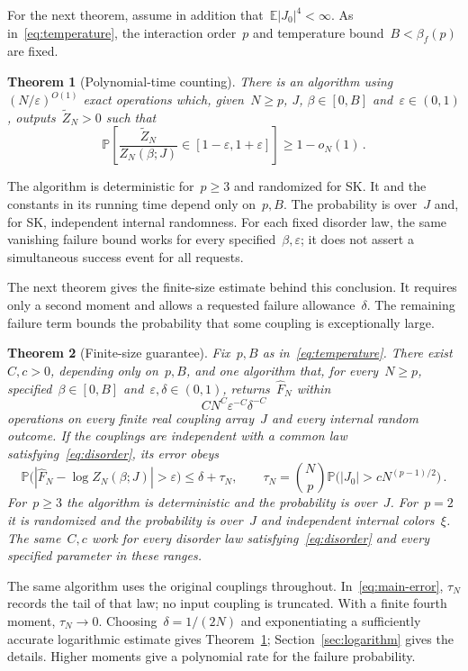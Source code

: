 \documentclass[10pt]{article}
\theoremstyle{plain}
\newtheorem{theorem}{Theorem}[section]
\theoremstyle{definition}
\theoremstyle{remark}
\begin{document}
For the next theorem, assume in addition that~$\mathbb E|J_0|^4<\infty$. As in~\eqref{eq:temperature}, the interaction order~$p$ and temperature bound~$B<\beta_f(p)$ are fixed.
\begin{theorem}[Polynomial-time counting]\label{cor:typical}
There is an algorithm using~$(N/\varepsilon)^{O(1)}$ exact operations which, given~$N\ge p$, $J$, $\beta\in[0,B]$ and~$\varepsilon\in(0,1)$, outputs~$\widetilde Z_N>0$ such that
\begin{equation}\label{eq:multiplicative-success}
 \mathbb P\!\left[
 \frac{\widetilde Z_N}{Z_N(\beta;J)}\in[1-\varepsilon,1+\varepsilon]
 \right]\ge1-o_N(1)\,.
\end{equation}
\end{theorem}
The algorithm is deterministic for~$p\ge3$ and randomized for SK. It and the constants in its running time depend only on~$p,B$. The probability is over~$J$ and, for SK, independent internal randomness. For each fixed disorder law, the same vanishing failure bound works for every specified~$\beta,\varepsilon$; it does not assert a simultaneous success event for all requests.

The next theorem gives the finite-size estimate behind this conclusion. It requires only a second moment and allows a requested failure allowance~$\delta$. The remaining failure term bounds the probability that some coupling is exceptionally large.
\begin{theorem}[Finite-size guarantee]\label{thm:main}
Fix~$p,B$ as in~\eqref{eq:temperature}. There exist~$C,c>0$, depending only on~$p,B$, and one algorithm that, for every~$N\ge p$, specified~$\beta\in[0,B]$ and~$\varepsilon,\delta\in(0,1)$, returns~$\widehat F_N$ within
\begin{equation}\label{eq:main-runtime}
 CN^C\varepsilon^{-C}\delta^{-C}
\end{equation}
operations on every finite real coupling array~$J$ and every internal random outcome. If the couplings are independent with a common law satisfying~\eqref{eq:disorder}, its error obeys
\begin{equation}\label{eq:main-error}
 \mathbb P\bigl(|\widehat F_N-\log Z_N(\beta;J)|>\varepsilon\bigr)
 \le\delta+\tau_N,\qquad
 \tau_N=\binom Np\mathbb P\bigl(|J_0|>cN^{(p-1)/2}\bigr)\,.
\end{equation}
For~$p\ge3$ the algorithm is deterministic and the probability is over~$J$. For~$p=2$ it is randomized and the probability is over~$J$ and independent internal colors~$\xi$. The same~$C,c$ work for every disorder law satisfying~\eqref{eq:disorder} and every specified parameter in these ranges.
\end{theorem}
The same algorithm uses the original couplings throughout. In~\eqref{eq:main-error}, $\tau_N$ records the tail of that law; no input coupling is truncated. With a finite fourth moment, $\tau_N\to0$. Choosing~$\delta=1/(2N)$ and exponentiating a sufficiently accurate logarithmic estimate gives Theorem~\ref{cor:typical}; Section~\ref{sec:logarithm} gives the details. Higher moments give a polynomial rate for the failure probability.
\end{document}
